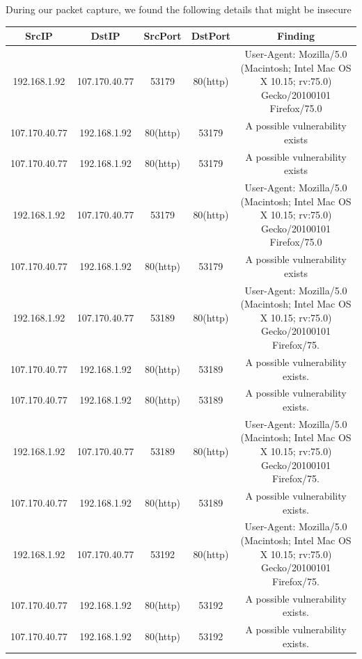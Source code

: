 \documentclass{article}
\begin{document}
\begin{center}
During our packet capture, we found the following details that might be insecure\\
 \begin{tabular}{||c c c c c||}
 \hline
 SrcIP & DstIP & SrcPort & DstPort & Finding \\ [0.5ex]
 \hline\hline
192.168.1.92 & 107.170.40.77 & 53179 & 80(http) & \multicolumn{1}{m{3cm}|}{User-Agent: Mozilla/5.0 (Macintosh; Intel Mac OS X 10.15; rv:75.0) Gecko/20100101 Firefox/75.0}\\
\hline
107.170.40.77 & 192.168.1.92 & 80(http) & 53179 & \multicolumn{1}{m{3cm}|}{A possible vulnerability exists}\\
\hline
107.170.40.77 & 192.168.1.92 & 80(http) & 53179 & \multicolumn{1}{m{3cm}|}{A possible vulnerability exists}\\
\hline
192.168.1.92 & 107.170.40.77 & 53179 & 80(http) & \multicolumn{1}{m{3cm}|}{User-Agent: Mozilla/5.0 (Macintosh; Intel Mac OS X 10.15; rv:75.0) Gecko/20100101 Firefox/75.0}\\
\hline
107.170.40.77 & 192.168.1.92 & 80(http) & 53179 & \multicolumn{1}{m{3cm}|}{A possible vulnerability exists}\\
\hline
192.168.1.92 & 107.170.40.77 & 53189 & 80(http) & \multicolumn{1}{m{3cm}|}{User-Agent: Mozilla/5.0 (Macintosh; Intel Mac OS X 10.15; rv:75.0) Gecko/20100101 Firefox/75.}\\
\hline
107.170.40.77 & 192.168.1.92 & 80(http) & 53189 & \multicolumn{1}{m{3cm}|}{A possible vulnerability exists.}\\
\hline
107.170.40.77 & 192.168.1.92 & 80(http) & 53189 & \multicolumn{1}{m{3cm}|}{A possible vulnerability exists.}\\
\hline
192.168.1.92 & 107.170.40.77 & 53189 & 80(http) & \multicolumn{1}{m{3cm}|}{User-Agent: Mozilla/5.0 (Macintosh; Intel Mac OS X 10.15; rv:75.0) Gecko/20100101 Firefox/75.}\\
\hline
107.170.40.77 & 192.168.1.92 & 80(http) & 53189 & \multicolumn{1}{m{3cm}|}{A possible vulnerability exists.}\\
\hline
192.168.1.92 & 107.170.40.77 & 53192 & 80(http) & \multicolumn{1}{m{3cm}|}{User-Agent: Mozilla/5.0 (Macintosh; Intel Mac OS X 10.15; rv:75.0) Gecko/20100101 Firefox/75.}\\
\hline
107.170.40.77 & 192.168.1.92 & 80(http) & 53192 & \multicolumn{1}{m{3cm}|}{A possible vulnerability exists.}\\
\hline
107.170.40.77 & 192.168.1.92 & 80(http) & 53192 & \multicolumn{1}{m{3cm}|}{A possible vulnerability exists.}\\

\end{tabular}
\end{center}
\end{document}
